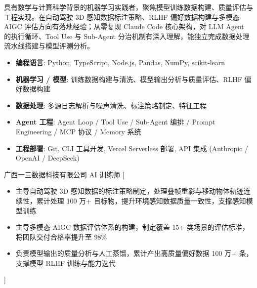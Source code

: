 \documentclass[zh]{resume}
\begin{document}
\makeheader

具有数学与计算科学背景的机器学习实践者，聚焦模型训练数据构建、质量评估与工程实现。在自动驾驶 3D 感知数据标注策略、RLHF 偏好数据构建与多模态 AIGC 评估方向有落地经验；从零复现 Claude Code 核心架构，对 LLM Agent 的执行循环、Tool Use 与 Sub-Agent 分治机制有深入理解，能独立完成数据处理流水线搭建与模型评测分析。

\begin{itemize}
    \item \textbf{编程语言}: Python, TypeScript, Node.js, Pandas, NumPy, scikit-learn
    \item \textbf{机器学习 / 模型}: 训练数据构建与清洗、模型输出分析与质量评估、RLHF 偏好数据构建
    \item \textbf{数据处理}: 多源日志解析与噪声清洗、标注策略制定、特征工程
    \item \textbf{Agent 工程}: Agent Loop / Tool Use / Sub-Agent 编排 / Prompt Engineering / MCP 协议 / Memory 系统
    \item \textbf{工程部署}: Git, CLI 工具开发, Vercel Serverless 部署, API 集成 (Anthropic / OpenAI / DeepSeek)
\end{itemize}

\begin{experiences}
    {广西一三数据科技有限公司 \quad AI 训练师}%
    [\begin{itemize}
      \item 主导自动驾驶 3D 感知数据的标注策略制定，处理叠帧重影与移动物体轨迹连续性，累计处理 100 万+ 目标物，提升环境感知数据质量一致性，支撑感知模型训练
      \item 主导多模态 AIGC 数据评估体系的构建，制定覆盖 15+ 类场景的评估标准，将团队交付合格率提升至 98\%
      \item 负责模型输出的质量分析与人工蒸馏，累计产出高质量偏好数据 100 万+ 条，支撑模型 RLHF 训练与能力迭代
    \end{itemize}]
\end{experiences}
\end{document}
